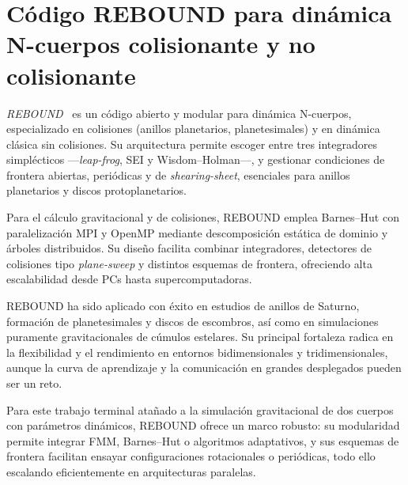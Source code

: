 \section[REBOUND para dinámica N-cuerpos]{Código REBOUND para dinámica N-cuerpos colisionante y no colisionante}%
\label{sec:state_of_the_art_09}

\textit{REBOUND}~\cite{Rein2012} es un código abierto y modular para dinámica N-cuerpos, especializado en colisiones (anillos planetarios, planetesimales) y en dinámica clásica sin colisiones. Su arquitectura permite escoger entre tres integradores simplécticos —\textit{leap-frog}, SEI y Wisdom–Holman—, y gestionar condiciones de frontera abiertas, periódicas y de \textit{shearing-sheet}, esenciales para anillos planetarios y discos protoplanetarios.

Para el cálculo gravitacional y de colisiones, REBOUND emplea Barnes–Hut con paralelización MPI y OpenMP mediante descomposición estática de dominio y árboles distribuidos. Su diseño facilita combinar integradores, detectores de colisiones tipo \textit{plane-sweep} y distintos esquemas de frontera, ofreciendo alta escalabilidad desde PCs hasta supercomputadoras.

REBOUND ha sido aplicado con éxito en estudios de anillos de Saturno, formación de planetesimales y discos de escombros, así como en simulaciones puramente gravitacionales de cúmulos estelares. Su principal fortaleza radica en la flexibilidad y el rendimiento en entornos bidimensionales y tridimensionales, aunque la curva de aprendizaje y la comunicación en grandes desplegados pueden ser un reto.

Para este trabajo terminal atañado a la simulación gravitacional de dos cuerpos con parámetros dinámicos, REBOUND ofrece un marco robusto: su modularidad permite integrar FMM, Barnes–Hut o algoritmos adaptativos, y sus esquemas de frontera facilitan ensayar configuraciones rotacionales o periódicas, todo ello escalando eficientemente en arquitecturas paralelas.

